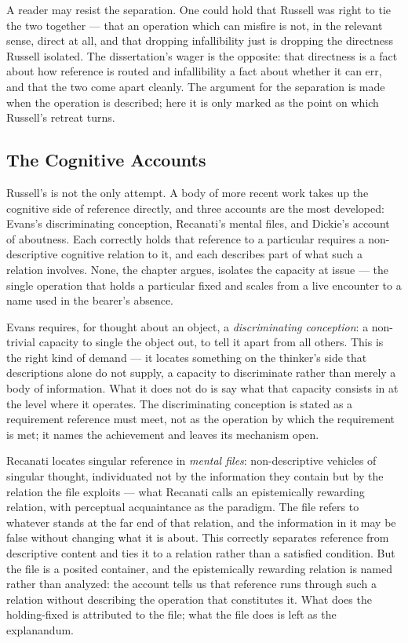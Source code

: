 \documentclass[12pt,a4paper]{article}
\begin{document}
A reader may resist the separation. One could hold that Russell was right to tie the two together --- that an operation which can misfire is not, in the relevant sense, direct at all, and that dropping infallibility just is dropping the directness Russell isolated. The dissertation's wager is the opposite: that directness is a fact about how reference is routed and infallibility a fact about whether it can err, and that the two come apart cleanly. The argument for the separation is made when the operation is described; here it is only marked as the point on which Russell's retreat turns.

\subsection{The Cognitive Accounts}\label{the-cognitive-accounts}

Russell's is not the only attempt. A body of more recent work takes up the cognitive side of reference directly, and three accounts are the most developed: Evans's discriminating conception, Recanati's mental files, and Dickie's account of aboutness. Each correctly holds that reference to a particular requires a non-descriptive cognitive relation to it, and each describes part of what such a relation involves. None, the chapter argues, isolates the capacity at issue --- the single operation that holds a particular fixed and scales from a live encounter to a name used in the bearer's absence.

Evans requires, for thought about an object, a \emph{discriminating conception}: a non-trivial capacity to single the object out, to tell it apart from all others. This is the right kind of demand --- it locates something on the thinker's side that descriptions alone do not supply, a capacity to discriminate rather than merely a body of information. What it does not do is say what that capacity consists in at the level where it operates. The discriminating conception is stated as a requirement reference must meet, not as the operation by which the requirement is met; it names the achievement and leaves its mechanism open.

Recanati locates singular reference in \emph{mental files}: non-descriptive vehicles of singular thought, individuated not by the information they contain but by the relation the file exploits --- what Recanati calls an epistemically rewarding relation, with perceptual acquaintance as the paradigm. The file refers to whatever stands at the far end of that relation, and the information in it may be false without changing what it is about. This correctly separates reference from descriptive content and ties it to a relation rather than a satisfied condition. But the file is a posited container, and the epistemically rewarding relation is named rather than analyzed: the account tells us that reference runs through such a relation without describing the operation that constitutes it. What does the holding-fixed is attributed to the file; what the file does is left as the explanandum.
\end{document}
